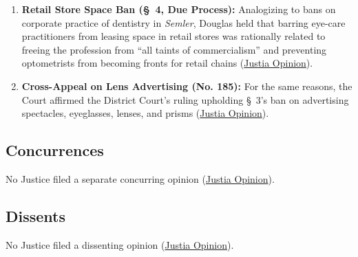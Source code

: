 \documentclass[12pt]{article}
\begin{document}
\begin{enumerate}
    \item \textbf{Retail Store Space Ban (\S~4, Due Process):} Analogizing to bans on corporate practice of dentistry in \textit{Semler}, Douglas held that barring eye-care practitioners from leasing space in retail stores was rationally related to freeing the profession from ``all taints of commercialism'' and preventing optometrists from becoming fronts for retail chains (\href{https://supreme.justia.com/cases/federal/us/348/483/}{Justia Opinion}).
    \item \textbf{Cross-Appeal on Lens Advertising (No. 185):} For the same reasons, the Court affirmed the District Court's ruling upholding \S~3's ban on advertising spectacles, eyeglasses, lenses, and prisms (\href{https://supreme.justia.com/cases/federal/us/348/483/}{Justia Opinion}).
\end{enumerate}

\subsection{Concurrences}
No Justice filed a separate concurring opinion (\href{https://supreme.justia.com/cases/federal/us/348/483/}{Justia Opinion}).

\subsection{Dissents}
No Justice filed a dissenting opinion (\href{https://supreme.justia.com/cases/federal/us/348/483/}{Justia Opinion}).
\end{document}
